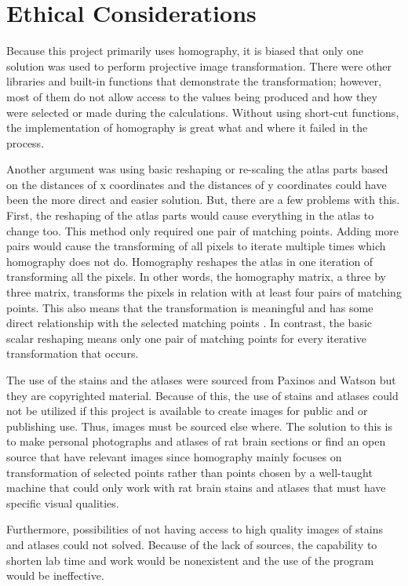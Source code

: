 \documentclass[10pt,twocolumn]{article}
\begin{document}
\section{Ethical Considerations}
Because this project primarily uses homography, it is biased that only one solution was used to perform projective image transformation. There were other libraries and built-in functions that demonstrate the transformation; however, most of them do not allow access to the values being produced and how they were selected or made during the calculations. Without using short-cut functions, the implementation of homography is great what and where it failed in the process.

Another argument was using basic reshaping or re-scaling the atlas parts based on the distances of x coordinates and the distances of y coordinates could have been the more direct and easier solution. But, there are a few problems with this. First, the reshaping of the atlas parts would cause everything in the atlas to change too. This method only required one pair of matching points. Adding more pairs would cause the transforming of all pixels to iterate multiple times which homography does not do. Homography reshapes the atlas in one iteration of transforming all the pixels. In other words, the homography matrix, a three by three matrix, transforms the pixels in relation with at least four pairs of matching points. This also means that the transformation is meaningful and has some direct relationship with the selected matching points \cite{lect_y}. In contrast, the basic scalar reshaping means only one pair of matching points for every iterative transformation that occurs. 

The use of the stains and the atlases were sourced from Paxinos and Watson but they are copyrighted material. Because of this, the use of stains and atlases could not be utilized if this project is available to create images for public and or publishing use. Thus, images must be sourced else where. The solution to this is to make personal photographs and atlases of rat brain sections or find an open source that have relevant images since homography mainly focuses on transformation of selected points rather than points chosen by a well-taught machine that could only work with rat brain stains and atlases that must have specific visual qualities.

Furthermore, possibilities of not having access to high quality images of stains and atlases could not solved. Because of the lack of sources, the capability to shorten lab time and work would be nonexistent and the use of the program would be ineffective.
\end{document}
